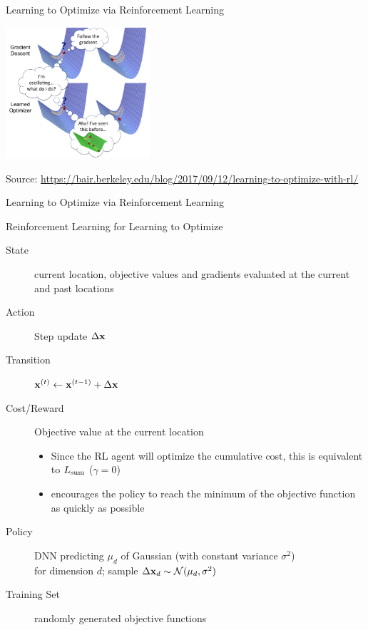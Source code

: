 \begin{frame}[c]{Learning to Optimize via Reinforcement Learning }

\centering
\includegraphics[width=0.4\textwidth]{images/l2o_comic}

\tiny
Source: \url{https://bair.berkeley.edu/blog/2017/09/12/learning-to-optimize-with-rl/}

\end{frame}
\begin{frame}[c]{Learning to Optimize via Reinforcement Learning }

\begin{block}{Reinforcement Learning for Learning to Optimize}
\begin{description}
\item[State] current location, objective values and gradients evaluated at the current and past locations
\pause
\item[Action] Step update $\Delta \mathbf{x}$
\pause
\item[Transition] $\mathbf{x}^{(t)} \leftarrow \mathbf{x}^{(t-1)} + \Delta \mathbf{x}$
\pause
\item[Cost/Reward] Objective value at the current location
\begin{itemize}
\item Since the RL agent will optimize the cumulative cost, this is equivalent to $L_{\text{sum}}$  ($\gamma=0$)
\item encourages the policy to reach the minimum of the objective function as quickly as possible
\end{itemize}
\pause
\item[Policy] DNN predicting $\mu_d$ of Gaussian (with constant variance $\sigma^2$)\\ for dimension $d$; sample $\Delta \mathbf{x}_d \sim \mathcal{N}(\mu_d, \sigma^2)$
\pause
\item[Training Set] randomly generated objective functions
\end{description}
\end{block}

\end{frame}
